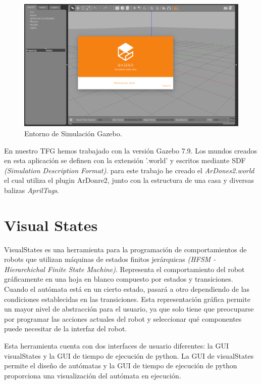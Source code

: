 \begin{figure}[H]
	\begin{center}
		\includegraphics[width=1\textwidth]{imag/IMG18.png}
				\caption{Entorno de Simulación Gazebo.} 
	\label{fig:Gazebo.}	
	\end{center}
\end{figure}

\hspace{1cm} En nuestro TFG hemos trabajado con la versión Gazebo 7.9. Los mundos creados en esta aplicación se definen con la extensión '.world' y escritos mediante SDF \textit{(Simulation Description Format)}. para este trabajo he creado el \emph{ArDones2.world} el cual utiliza el plugin ArDonre2, junto con la estructura de una casa y diversas balizas \textit{AprilTags}.

\section{Visual States}
\hspace{1cm} VisualStates es una herramienta para la programación de comportamientos de robots que utilizan máquinas de estados finitos jerárquicas \textit{(HFSM - Hierarchichal Finite State Machine)}. Representa el comportamiento del robot gráficamente en una hoja en blanco compuesto por estados y transiciones. Cuando el autómata está en un cierto estado, pasará a otro dependiendo de las condiciones establecidas en las transiciones. Esta representación gráfica permite un mayor nivel de abstracción para el usuario, ya que solo tiene que preocuparse por programar las acciones actuales del robot y seleccionar qué componentes puede necesitar de la interfaz del robot.

\hspace{1cm} Esta herramienta cuenta con dos interfaces de usuario diferentes: la GUI visualStates y la GUI de tiempo de ejecución de python. La GUI de visualStates permite el diseño de autómatas y la GUI de tiempo de ejecución de python proporciona una visualización del autómata en ejecución. 
\\

